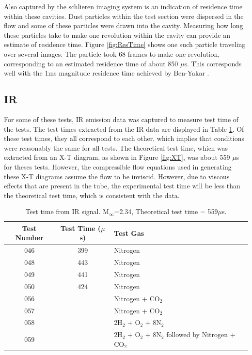 Also captured by the schlieren imaging system is an indication of residence time within these cavities. Dust particles within the test section were dispersed in the flow and some of these particles were drawn into the cavity. Measuring how long these particles take to make one revolution within the cavity can provide an estimate of residence time. Figure \ref{fig:ResTime} shows one such particle traveling over several images. The particle took 68 frames to make one revolution, corresponding to an estimated residence time of about 850 $\mu$s. This corresponds well with the 1ms magnitude residence time achieved by Ben-Yakar \cite{ben2001cavity}.


\subsection{IR}

For some of these tests, IR emission data was captured to measure test time of the tests. The test times extracted from the IR data are displayed in Table \ref{Table:IRtest}. Of these test times, they all correspond to each other, which implies that conditions were reasonably the same for all tests. The theoretical test time, which was extracted from an X-T diagram, as shown in Figure \ref{fig:XT}, was about 559 $\mu$s for theses tests. However, the compressible flow equations used in generating these X-T diagrams assume the flow to be inviscid. However, due to viscous effects that are present in the tube, the experimental test time will be less than the theoretical test time, which is consistent with the data.

\begin{table}[]
\centering
\caption[Test time calculated with IR signal]{Test time from IR signal. M$_\infty$=2.34, Theoretical test time = 559$\mu$s.}
\label{Table:IRtest}
\begin{tabular}{c|c|l}

Test Number & Test Time ($\mu$s) & Test Gas\\ \hline
046         & 399        &Nitrogen     \\ 
048         & 443        &Nitrogen     \\ 
049         & 441        &Nitrogen     \\ 
050         & 424        &Nitrogen     \\ 
056			& 			 &Nitrogen + CO$_2$	\\
057			& 			 &Nitrogen + CO$_2$  \\
058			& 			 &2H$_2$ + O$_2$ + 8N$_2$			   \\
059			& 			 &2H$_2$ + O$_2$ + 8N$_2$ followed by Nitrogen + CO$_2$			   \\
\end{tabular}
\end{table}

